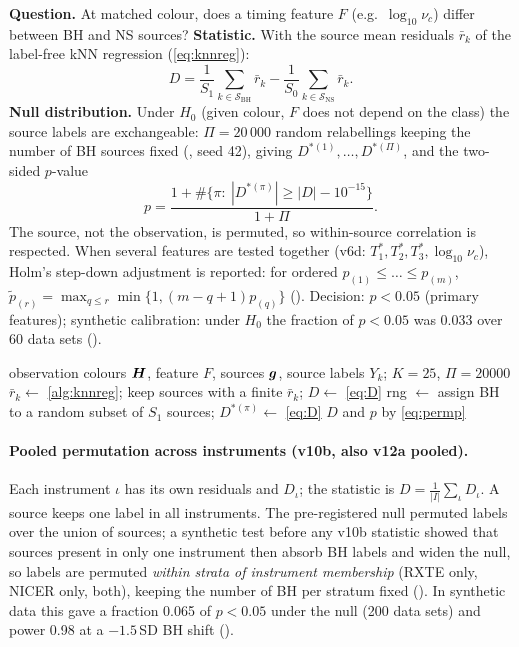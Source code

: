 \textbf{Question.} At matched colour, does a timing feature $F$ (e.g.\ $\log_{10}\nu_c$) differ between BH and NS sources?
\textbf{Statistic.} With the source mean residuals $\bar r_k$ of the label-free kNN regression (\cref{eq:knnreg}):
\begin{equation}
D = \frac{1}{S_1}\sum_{k\in\mathcal S_\mathrm{BH}}\bar r_k - \frac{1}{S_0}\sum_{k\in\mathcal S_\mathrm{NS}}\bar r_k .\label{eq:D}
\end{equation}
\textbf{Null distribution.} Under $H_0$ (given colour, $F$ does not depend on the class) the source labels are exchangeable:
$\Pi=20\,000$ random relabellings keeping the number of BH sources fixed (, seed 42), giving
$D^{\ast(1)},\dots,D^{\ast(\Pi)}$, and the two-sided $p$-value
\begin{equation}
p = \frac{1+\#\{\pi:\ |D^{\ast(\pi)}|\ge|D|-10^{-15}\}}{1+\Pi}. \label{eq:permp}
\end{equation}
The source, not the observation, is permuted, so within-source correlation is respected. When several features are tested
together (v6d: $T_1^\ast,T_2^\ast,T_3^\ast,\log_{10}\nu_c$), Holm's step-down adjustment is reported: for ordered
$p_{(1)}\le\dots\le p_{(m)}$, $\tilde p_{(r)}=\max_{q\le r}\min\{1,(m-q+1)p_{(q)}\}$ (). Decision: $p<0.05$
(primary features); synthetic calibration: under $H_0$ the fraction of $p<0.05$ was 0.033 over 60 data sets
().

\begin{algorithm}[htbp]
\caption{Colour-conditional source permutation test}\label{alg:perm}
\begin{algorithmic}[1]
\Require observation colours $\bm{H}$, feature $F$, sources $\bm{g}$, source labels $Y_k$; $K=25$, $\Pi=20000$
\State $\bar r_k\gets$ \cref{alg:knnreg}; keep sources with a finite $\bar r_k$; $D\gets$ \cref{eq:D}
\State rng $\gets$ 
 \State assign BH to a random subset of $S_1$ sources; $D^{\ast(\pi)}\gets$ \cref{eq:D} \EndFor
\State \Return $D$ and $p$ by \cref{eq:permp}
\end{algorithmic}
\end{algorithm}

\paragraph{Pooled permutation across instruments (v10b, also v12a pooled).} Each instrument $\iota$ has its own residuals
and $D_\iota$; the statistic is $D=\frac{1}{|I|}\sum_\iota D_\iota$. A source keeps one label in all instruments. The
pre-registered null permuted labels over the union of sources; a synthetic test before any v10b statistic showed that
sources present in only one instrument then absorb BH labels and widen the null, so labels are permuted \emph{within
strata of instrument membership} (RXTE only, NICER only, both), keeping the number of BH per stratum fixed
(). In synthetic data this gave a fraction 0.065 of $p<0.05$ under the null (200 data sets) and
power 0.98 at a $-1.5$\,SD BH shift ().

